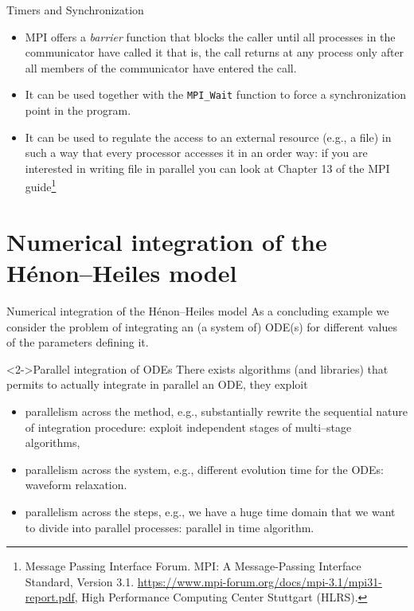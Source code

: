 \documentclass[xcolor={svgnames,usenames}]{beamer}
\begin{document}
\begin{frame}[fragile]{Timers and Synchronization}
\begin{itemize}
	\item MPI offers a \emph{barrier} function that blocks the caller until all processes in the communicator have called it 
	that is, the call returns at any process only after all members of the communicator have entered the call. 
	\item<2-> It can be used together with the \texttt{MPI_Wait} function to force a synchronization point in the program.
	\item<3-> It can be used to regulate the access to an external resource (e.g., a file) in such a way that every processor accesses it in an order way: if you are interested in writing file in parallel you can look at Chapter 13 of the MPI guide\footnote<3->{Message Passing Interface Forum. MPI: A Message-Passing Interface Standard, Version 3.1. \url{https://www.mpi-forum.org/docs/mpi-3.1/mpi31-report.pdf}, High Performance Computing Center Stuttgart (HLRS).}
\end{itemize}

\end{frame}

\section{Numerical integration of the H\'enon--Heiles model}

\begin{frame}{Numerical integration of the H\'enon--Heiles model}
As a concluding example we consider the problem of integrating an (a system of) ODE(s) for different values of the parameters defining it.
\begin{block}<2->{Parallel integration of ODEs}
There exists algorithms (and libraries) that permits to actually integrate in parallel an ODE, they exploit
\begin{itemize}
	\item parallelism across the method, e.g., substantially rewrite the sequential nature of integration procedure: exploit independent stages of multi--stage algorithms, 
	\item parallelism across the system, e.g., different evolution time for the ODEs: waveform relaxation.
	\item parallelism across the steps, e.g., we have a huge time domain that we want to divide into parallel processes: parallel in time algorithm.
\end{itemize}
\end{block}

\end{frame}
\end{document}
